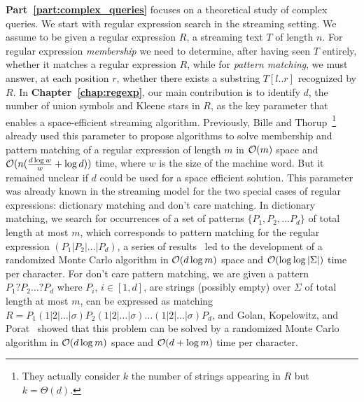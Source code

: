 \textbf{Part~\ref{part:complex_queries}} focuses on a theoretical study of complex queries. 
%
We start with regular expression search in the streaming setting.
%
We assume to be given a regular expression $R$, a streaming text $T$ of length $n$. For regular expression \emph{membership} we need to determine, after having seen $T$ entirely, whether it matches a regular expression $R$, while for \emph{pattern matching}, we must answer, at each position $r$, whether there exists a substring $T[l..r]$ recognized by $R$.
In \textbf{Chapter~\ref{chap:regexp}}, our main contribution is to identify $d$, the number of union symbols and Kleene stars in $R$, as the key parameter that enables a space-efficient streaming algorithm. 
Previously, Bille and Thorup~\cite{doi:10.1137/1.9781611973075.104}\footnote{They actually consider $k$ the number of strings appearing in $R$ but $k=\Theta(d)$.} already used this parameter to propose algorithms to solve membership and pattern matching of a regular expression of length $m$ in $\mathcal{O}(m)$ space and $\mathcal{O}(n(\frac{d\log w}{w} + \log d))$ time, where $w$ is the size of the machine word. But it remained unclear if $d$ could be used for a space efficient solution.
This parameter was already known in the streaming model for the two special cases of regular expressions: dictionary matching and don't care matching. In dictionary matching, we search for occurrences of a set of patterns $\{P_1, P_2, ... P_d \}$ of total length at most $m$, which corresponds to pattern matching for the regular expression $(P_1| P_2| ... | P_d)$, a series of results~\cite{Porat:09,DBLP:journals/talg/BreslauerG14,DBLP:conf/esa/CliffordFPSS15,DBLP:conf/esa/GolanP17,DBLP:conf/icalp/GolanKP18} led to the development of a randomized Monte Carlo algorithm in $\mathcal{O}(d\log m)$ space and $\mathcal{O}(\log \log |\Sigma|)$ time per character.
For don't care pattern matching, we are given a pattern $P_1 ? P_2 ... ? P_d$ where $P_i$, $i \in [1,d]$, are strings (possibly empty) over $\Sigma$ of total length at most $m$, can be expressed as matching $R = P_1 (1|2|\ldots|\sigma) P_2 (1|2|\ldots|\sigma) \ldots (1|2|\ldots|\sigma) P_{d}$, and Golan, Kopelowitz, and Porat~\cite{DBLP:journals/algorithmica/GolanKP19} showed that this problem can be solved by a randomized Monte Carlo algorithm in $\mathcal{O}(d \log m)$ space and $\mathcal{O}(d+\log m)$ time per character.

